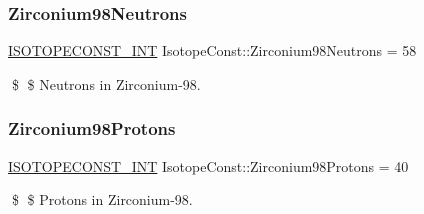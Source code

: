 \subsubsection{\texorpdfstring{Zirconium98\+Neutrons}{Zirconium98Neutrons}}
{\footnotesize\ttfamily \mbox{\hyperlink{group___isotope_const-_macros_ga5f18360b3e99483a35c32d789e62621c}{I\+S\+O\+T\+O\+P\+E\+C\+O\+N\+S\+T\+\_\+\+I\+NT}} Isotope\+Const\+::\+Zirconium98\+Neutrons = 58}

\$ \$ Neutrons in Zirconium-\/98. \mbox{\label{group___isotope_const-_zirconium-_zr98_ga3eb36796229df22fbcd07d39f53af52a}} 
\subsubsection{\texorpdfstring{Zirconium98\+Protons}{Zirconium98Protons}}
{\footnotesize\ttfamily \mbox{\hyperlink{group___isotope_const-_macros_ga5f18360b3e99483a35c32d789e62621c}{I\+S\+O\+T\+O\+P\+E\+C\+O\+N\+S\+T\+\_\+\+I\+NT}} Isotope\+Const\+::\+Zirconium98\+Protons = 40}

\$ \$ Protons in Zirconium-\/98. 